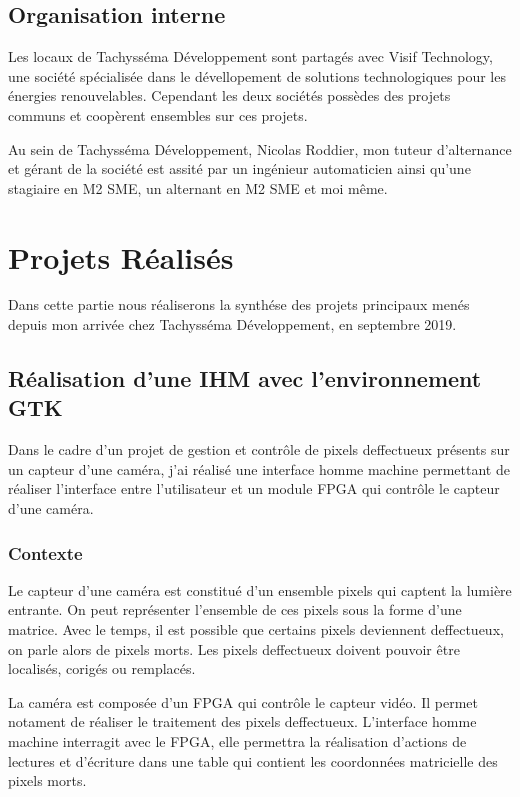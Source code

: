 \subsection{Organisation interne}

Les locaux de Tachysséma Développement sont partagés avec Visif Technology, une société spécialisée dans le dévellopement de solutions technologiques pour les énergies renouvelables. Cependant les deux sociétés possèdes des projets communs et coopèrent ensembles sur ces projets. 

Au sein de Tachysséma Développement, Nicolas Roddier, mon tuteur d'alternance et gérant de la société est assité par un ingénieur automaticien ainsi qu'une stagiaire en M2 SME, un alternant en M2 SME et moi même. 





\newpage

\section{Projets Réalisés}
Dans cette partie nous réaliserons la synthése des projets principaux menés depuis mon arrivée chez Tachysséma Développement, en septembre 2019. 

\subsection{Réalisation d'une IHM avec l'environnement GTK}

Dans le cadre d'un projet de gestion et contrôle de pixels deffectueux présents sur un capteur d'une caméra, j'ai réalisé une interface homme machine permettant de réaliser l'interface entre l'utilisateur et un module FPGA qui contrôle le capteur d'une caméra. 
\\ 

\subsubsection{Contexte} 

Le capteur d'une caméra est constitué d'un ensemble pixels qui captent la lumière entrante. On peut représenter l'ensemble de ces pixels sous la forme d'une matrice. Avec le temps, il est possible que certains pixels deviennent deffectueux, on parle alors de pixels morts. Les pixels deffectueux doivent pouvoir être localisés, corigés ou remplacés.  
\newline

La caméra est composée d'un FPGA qui contrôle le capteur vidéo. Il permet notament de réaliser le traitement des pixels deffectueux. L'interface homme machine interragit avec le FPGA, elle permettra la réalisation d'actions de lectures et d'écriture dans une table qui contient les coordonnées matricielle des pixels morts. 

